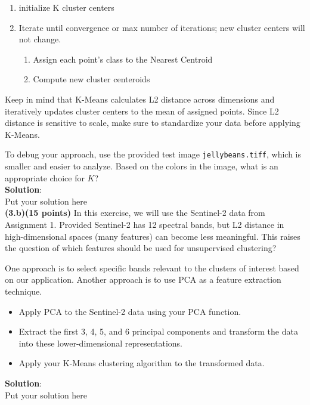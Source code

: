 \documentclass[12pt]{article}
\begin{document}
\begin{enumerate}
    \item initialize K cluster centers 
    \item Iterate until convergence or max number of iterations; new cluster centers will not change.
    \begin{enumerate}
        \item Assign each point's class to the Nearest Centroid
        \item Compute new cluster centeroids
    \end{enumerate}
\end{enumerate}

\noindent Keep in mind that K-Means calculates L2 distance across dimensions and iteratively updates cluster centers to the mean of assigned points. Since L2 distance is sensitive to scale, make sure to standardize your data before applying K-Means.  

To debug your approach, use the provided test image \texttt{jellybeans.tiff}, which is smaller and easier to analyze. Based on the colors in the image, what is an appropriate choice for \( K \)?  \\

\noindent\textbf{Solution}:\\
Put your solution here\\

\noindent\textbf{(3.b)(15 points)} In this exercise, we will use the Sentinel-2 data from Assignment 1. Provided Sentinel-2 has 12 spectral bands, but L2 distance in high-dimensional spaces (many features) can become less meaningful. This raises the question of which features should be used for unsupervised clustering?  

One approach is to select specific bands relevant to the clusters of interest based on our application. Another approach is to use PCA as a feature extraction technique.  

\begin{itemize}
\item Apply PCA to the Sentinel-2 data using your PCA function.  
\item Extract the first 3, 4, 5, and 6 principal components and transform the data into these lower-dimensional representations.  
\item Apply your K-Means clustering algorithm to the transformed data.\\
\end{itemize}

\noindent\textbf{Solution}:\\
Put your solution here\\
\end{document}

